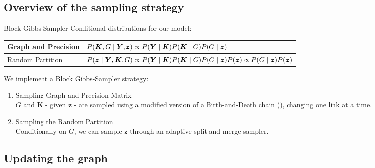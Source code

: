 \subsection{Overview of the sampling strategy}

\begin{frame}{Block Gibbs Sampler}
    Conditional distributions for our model:
    \begin{table}[tb]
        \centering
        \begin{tabular}{ll}
        \toprule
        Graph and Precision & $\small P(\bm{K},G \mid \bm{Y},\bm{z}) \propto P(\bm{Y} \mid \bm{K})P(\bm{K} \mid {G}) P(G \mid \bm{z})$ \\
        \hline
        Random Partition & $\small P(\bm{z} \mid \bm{Y},\bm{K},G) \propto P(\bm{Y} \mid \bm{K})P(\bm{K} \mid {G})P(G \mid \bm{z})P(\bm{z}) \propto P(G \mid \bm{z})P(\bm{z}) $ \\
        \bottomrule
        \end{tabular}
    \end{table}

    \pause 

    We implement a Block Gibbs-Sampler strategy:
    \begin{enumerate}
        \item \alert{Sampling Graph and Precision Matrix}\\
        $G$ and $\bm{K}$ - given $\bm{z}$ - are sampled using a modified version of a Birth-and-Death chain (\cite{mohammadiBayesianStructureLearning2015a}), changing one link at a time.
        \item \alert{Sampling the Random Partition}\\
        Conditionally on $G$, we can sample $\bm{z}$ through an adaptive split and merge\vphantom{changepoint} sampler.
    \end{enumerate}
\end{frame}

\subsection{Updating the graph}

